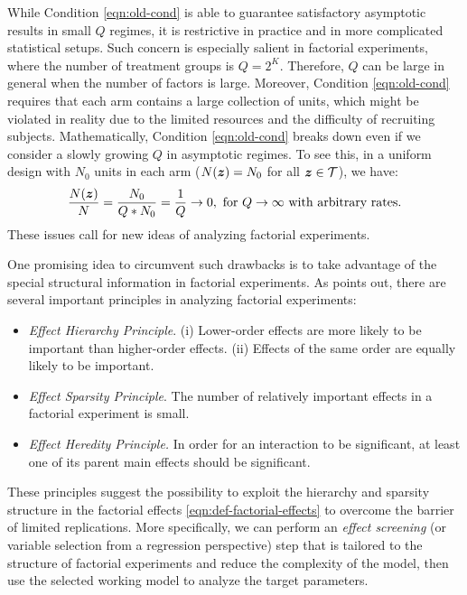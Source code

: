 \documentclass[12pt]{article}
\begin{document}
While Condition \eqref{eqn:old-cond} is able to guarantee satisfactory asymptotic results in small $Q$ regimes, it is restrictive in practice and in more complicated statistical setups. Such concern is  especially salient in factorial experiments, where the number of treatment groups is  $Q = 2^K$. Therefore, $Q$ can be large in general when the number of factors is large. Moreover, Condition \eqref{eqn:old-cond} requires that each arm contains a large collection of units, which might be violated in reality due to the limited resources and the difficulty of recruiting subjects. Mathematically, Condition \eqref{eqn:old-cond} breaks down even if we consider a slowly growing $Q$ in asymptotic regimes.  To see this, in a uniform design with $N_0$ units in each arm ($N({\boldsymbol{z}}) = N_0$ for all ${\boldsymbol{z}}\in{\mathcal{T}}$),  we have:
\begin{align*}
    \frac{N({\boldsymbol{z}})}{N} = \frac{N_0}{Q * N_0} = \frac{1}{Q} \to 0, \text{ for $Q\to\infty$ with arbitrary rates}.
\end{align*}
These issues call for new ideas of analyzing factorial experiments.  

One promising idea to circumvent such drawbacks is to take advantage of the special structural information in factorial experiments. As \cite{wu2011experiments} points out, there are several important principles in analyzing factorial experiments:
\begin{itemize}
    \item \textit{Effect Hierarchy Principle}.
(i) Lower-order effects are more likely to be important than higher-order effects. (ii) Effects of the same order are equally likely to be important.
    \item \textit{Effect Sparsity Principle}.
The number of relatively important effects in a factorial experiment is small.
    \item \textit{Effect Heredity Principle.}
In order for an interaction to be significant, at least one of its parent main effects
should be significant. 
\end{itemize}
These principles suggest the possibility to exploit the hierarchy and sparsity structure in the factorial effects \eqref{eqn:def-factorial-effects} to overcome the barrier of limited replications. More specifically, we can perform an \textit{effect screening} (or variable selection from a regression perspective) step that is tailored to the structure of factorial experiments and reduce the complexity of the model, then use the selected working model to analyze the target parameters. 
\end{document}
